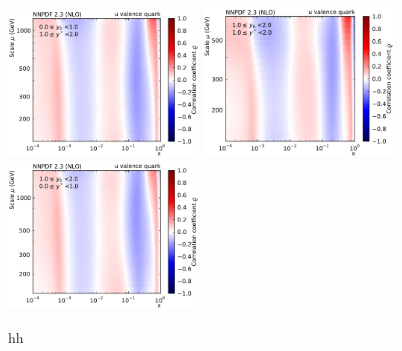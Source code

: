 \begin{figure}[htbp]
    \includegraphics[width=0.45\textwidth]{figures/pdf_constraints/corr_PTMAXEXPYS_YBYS_NLO_FINALBINS_NNPDF23_u_valence_quark_ys1_0yb0_0_cl.pdf}\hfill
    \includegraphics[width=0.45\textwidth]{figures/pdf_constraints/corr_PTMAXEXPYS_YBYS_NLO_FINALBINS_NNPDF23_u_valence_quark_ys1_0yb1_0_cl.pdf}\hfill
    \includegraphics[width=0.45\textwidth]{figures/pdf_constraints/corr_PTMAXEXPYS_YBYS_NLO_FINALBINS_NNPDF23_u_valence_quark_ys0_0yb0_0_cl.pdf}\hfill
    \caption{}hh
    \label{fig:pdfconstraints_gluon}
\end{figure}

